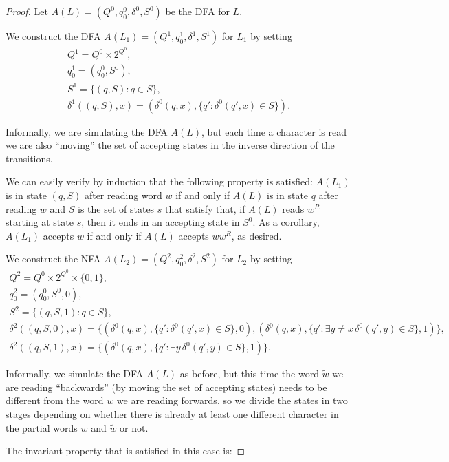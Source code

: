 \begin{proof}
Let $A(L) = (Q^0, q^0_0, \delta^0, S^0)$ be the DFA for $L$.

We construct the DFA $A(L_1) = (Q^1, q^1_0, \delta^1, S^1)$ for $L_1$ by setting
\begin{gather*}
Q^1 = Q^0 \times 2^{Q^0}, \\ q_0^1 = (q_0^0, S^0), \\ S^1 = \{(q, S) : q \in S\}, \\
\delta^1((q, S), x) = (\delta^0(q, x), \{q' : \delta^0(q', x) \in S\}).
\end{gather*}

Informally, we are simulating the DFA $A(L)$, but each time a character is read we are also ``moving'' the set of accepting states
in the inverse direction of the transitions. 

We can easily verify by induction that the following property is satisfied: $A(L_1)$ is in state $(q, S)$ after reading word $w$ if and only if
$A(L)$ is in state $q$ after reading $w$ and $S$ is the set of states $s$ that satisfy that, if $A(L)$ reads $w^R$ starting at state $s$, then it
ends in an accepting state in $S^0$. As a corollary, $A(L_1)$ accepts $w$ if and only if $A(L)$ accepts $ww^R$, as desired. 

We construct the NFA $A(L_2) = (Q^2, q^2_0, \delta^2, S^2)$ for $L_2$ by setting
\begin{gather*}
Q^2 = Q^0 \times 2^{Q^0} \times \{0, 1\}, \\ q_0^2 = (q_0^0, S^0, 0), \\ S^2 = \{(q, S, 1) : q \in S\}, \\
\delta^2((q, S, 0), x) = \{(\delta^0(q, x), \{q' : \delta^0(q', x) \in S\}, 0), (\delta^0(q, x), \{q' : \exists y \neq x \, \delta^0(q', y) \in S\}, 1)\}, \\
\delta^2((q, S, 1), x) = \{(\delta^0(q, x), \{q' : \exists y \, \delta^0(q', y) \in S\}, 1)\}.
\end{gather*}

Informally, we simulate the DFA $A(L)$ as before, but this time the word $\tilde{w}$ we are reading ``backwards'' (by moving the set of 
accepting states) needs to be different from the word $w$ we are reading forwards, so we divide the states in two stages depending on 
whether there is already at least one different character in the partial words $w$ and $\tilde{w}$ or not. 

The invariant property that is satisfied in this case is:


\end{proof}
